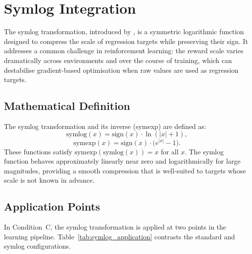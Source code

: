 \section{Symlog Integration}
\label{sec:method_symlog}

The symlog transformation, introduced by \cite{hafner2023dreamerv3}, is a
symmetric logarithmic function designed to compress the scale of regression targets
while preserving their sign. It addresses a common challenge in reinforcement
learning: the reward scale varies dramatically across environments and over the
course of training, which can destabilise gradient-based optimisation when raw
values are used as regression targets.

\subsection{Mathematical Definition}
\label{subsec:method_symlog_def}

The symlog transformation and its inverse (symexp) are defined as:
\begin{equation}
    \label{eq:symlog_meth}
    \text{symlog}(x) = \text{sign}(x) \cdot \ln(|x| + 1),
\end{equation}
\begin{equation}
    \label{eq:symexp_meth}
    \text{symexp}(x) = \text{sign}(x) \cdot \bigl( e^{|x|} - 1 \bigr).
\end{equation}
These functions satisfy $\text{symexp}(\text{symlog}(x)) = x$ for all $x$. The
symlog function behaves approximately linearly near zero and logarithmically for
large magnitudes, providing a smooth compression that is well-suited to targets
whose scale is not known in advance.

\subsection{Application Points}
\label{subsec:method_symlog_apply}

In Condition~C, the symlog transformation is applied at two points in the learning
pipeline. Table~\ref{tab:symlog_application} contrasts the standard and symlog
configurations.

